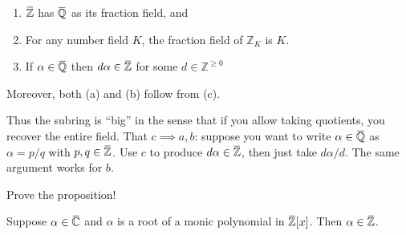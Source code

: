 \begin{proposition}[$\ff(\ZZ_K) = K$ ]

\envlist

\begin{enumerate}
\def\labelenumi{\alph{enumi}.}
\tightlist
\item
  \(\mkern 1.5mu\overline{\mkern-1.5mu{\mathbb{Z}}\mkern-1.5mu}\mkern 1.5mu\)
  has
  \(\mkern 1.5mu\overline{\mkern-1.5mu{\mathbb{Q}}\mkern-1.5mu}\mkern 1.5mu\)
  as its fraction field, and
\item
  For any number field \(K\), the fraction field of \({\mathbb{Z}}_K\)
  is \(K\).
\item
  If
  \(\alpha\in \mkern 1.5mu\overline{\mkern-1.5mu{\mathbb{Q}}\mkern-1.5mu}\mkern 1.5mu\)
  then
  \(d \alpha\in \mkern 1.5mu\overline{\mkern-1.5mu{\mathbb{Z}}\mkern-1.5mu}\mkern 1.5mu\)
  for some \(d\in {\mathbb{Z}}^{\geq 0}\)
\end{enumerate}

Moreover, both (a) and (b) follow from (c).

\end{proposition}

\begin{remark}

Thus the subring is ``big'' in the sense that if you allow taking
quotients, you recover the entire field. That \(c\implies a,b\): suppose
you want to write
\(\alpha \in \mkern 1.5mu\overline{\mkern-1.5mu{\mathbb{Q}}\mkern-1.5mu}\mkern 1.5mu\)
as \(\alpha=p/q\) with
\(p,q \in \mkern 1.5mu\overline{\mkern-1.5mu{\mathbb{Z}}\mkern-1.5mu}\mkern 1.5mu\).
Use \(c\) to produce
\(d\alpha\in \mkern 1.5mu\overline{\mkern-1.5mu{\mathbb{Z}}\mkern-1.5mu}\mkern 1.5mu\),
then just take \(d\alpha /d\). The same argument works for \(b\).

\end{remark}

\begin{exercise}[?]

Prove the proposition!

\end{exercise}

\begin{proposition}

Suppose
\(\alpha\in \mkern 1.5mu\overline{\mkern-1.5mu{\mathbb{C}}\mkern-1.5mu}\mkern 1.5mu\)
and \(\alpha\) is a root of a monic polynomial in
\(\mkern 1.5mu\overline{\mkern-1.5mu{\mathbb{Z}}\mkern-1.5mu}\mkern 1.5mu [x]\).
Then
\(\alpha\in \mkern 1.5mu\overline{\mkern-1.5mu{\mathbb{Z}}\mkern-1.5mu}\mkern 1.5mu\).

\end{proposition}


